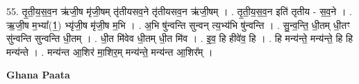 \documentclass[17pt]{extarticle}
\begin{document}
55. तृ॒ती॒य॒स॒व॒न ऋ॑जी॒ष मृ॑जी॒षम् तृ॑तीयसव॒ने तृ॑तीयसव॒न ऋ॑जी॒षम् । . तृ॒ती॒य॒स॒व॒न इति॑ तृतीय - स॒व॒ने । . ऋ॒जी॒ष म॒भ्या᳚(1॒) भ्यृ॑जी॒ष मृ॑जी॒ष म॒भि । . अ॒भि षु॑न्वन्ति सुन्वन् त्य॒भ्य॑भि षु॑न्वन्ति । . सु॒न्व॒न्ति॒ धी॒तम् धी॒तꣳ सु॑न्वन्ति सुन्वन्ति धी॒तम् । . धी॒त मि॑वेव धी॒तम् धी॒त मि॑व । . इ॒व॒ हि हीवे॑व॒ हि । . हि मन्य॑न्ते॒ मन्य॑न्ते॒ हि हि मन्य॑न्ते । . मन्य॑न्त आ॒शिर॑ मा॒शिर॒म् मन्य॑न्ते॒ मन्य॑न्त आ॒शिर᳚म् । \newline

\textbf{Ghana Paata } \newline
\end{document}
